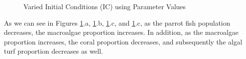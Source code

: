 \documentclass[12pt]{article}
\begin{document}
\begin{figure}[H]
        \quad
        \caption{Varied Initial Conditions (IC) using Parameter Values}%
        \label{fig:IC_graphs}%
\end{figure}
As we can see in Figures \ref{fig:IC_graphs}.a, \ref{fig:IC_graphs}.b, \ref{fig:IC_graphs}.c, and \ref{fig:IC_graphs}.c, as the parrot fish population decreases, the macroalgae proportion increases. In addition, as the macroalgae proportion increases, the coral proportion decreases, and subsequently the algal turf proportion decreases as well.\\
\end{document}
